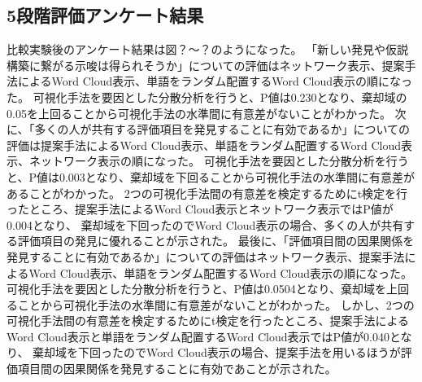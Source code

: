 \documentclass[syuuron]{kuee}
\begin{document}
		\subsection{5段階評価アンケート結果}
		比較実験後のアンケート結果は図？～？のようになった。
		「新しい発見や仮説構築に繋がる示唆は得られそうか」についての評価はネットワーク表示、提案手法によるWord Cloud表示、単語をランダム配置するWord Cloud表示の順になった。
		可視化手法を要因とした分散分析を行うと、P値は0.230となり、棄却域の0.05を上回ることから可視化手法の水準間に有意差がないことがわかった。
		次に、「多くの人が共有する評価項目を発見することに有効であるか」についての評価は提案手法によるWord Cloud表示、単語をランダム配置するWord Cloud表示、ネットワーク表示の順になった。
		可視化手法を要因とした分散分析を行うと、P値は0.003となり、棄却域を下回ることから可視化手法の水準間に有意差があることがわかった。
		2つの可視化手法間の有意差を検定するためにt検定を行ったところ、提案手法によるWord Cloud表示とネットワーク表示ではP値が0.004となり、
		棄却域を下回ったのでWord Cloud表示の場合、多くの人が共有する評価項目の発見に優れることが示された。
		最後に、「評価項目間の因果関係を発見することに有効であるか」についての評価はネットワーク表示、提案手法によるWord Cloud表示、単語をランダム配置するWord Cloud表示の順になった。
		可視化手法を要因とした分散分析を行うと、P値は0.0504となり、棄却域を上回ることから可視化手法の水準間に有意差がないことがわかった。
		しかし、2つの可視化手法間の有意差を検定するためにt検定を行ったところ、提案手法によるWord Cloud表示と単語をランダム配置するWord Cloud表示ではP値が0.040となり、
		棄却域を下回ったのでWord Cloud表示の場合、提案手法を用いるほうが評価項目間の因果関係を発見することに有効であことが示された。
	
\end{document}
